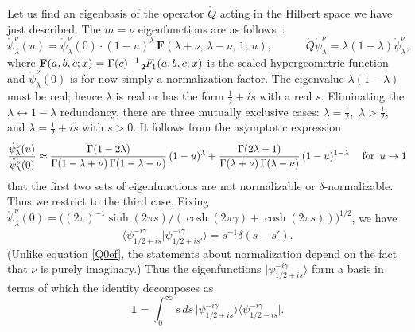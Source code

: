 \documentclass[12pt]{article}
\newcommand{\hgf}{%
\,\tensor[_{2\kern-1.2pt}]{F}{_{\kern-0.8pt 1}}\kern-1.2pt}
\newcommand{\hgfs}{\mathbf{F}}
\newcommand{\blangle}{\bigl\langle}
\newcommand{\brangle}{\bigr\rangle}
\newcommand*{\bbra}[1]{\blangle{#1}\big|}
\newcommand*{\bket}[1]{\big|{#1}\brangle}
\newcommand*{\bbraket}[2]{\blangle{#1}\big|{#2}\brangle}
\newcommand{\unit}{\mathbf{1}}
\newcommand{\rpsi}{\mathring{\psi}}
\newcommand{\rQ}{\mathring{Q}}
\newcommand{\lam}{\lambda}
\newcommand{\ga}{\gamma}
\newcommand{\ov}{\over}
\begin{document}
Let us find an eigenbasis of the operator $\rQ$ acting in the Hilbert space we have just described. The $m=\nu$ eigenfunctions are as follows~\cite{SL2R}:
\begin{equation} \label{Eucpsi}
\rpsi^{\nu}_{\lambda}(u)=\rpsi^{\nu}_{\lambda}(0)\cdot
(1-u)^\lambda\,\hgfs(\lambda+\nu,\,\lambda-\nu,\,1;\,u),
\qquad\quad
\rQ\rpsi^{\nu}_{\lambda}=\lambda(1-\lambda)\rpsi^{\nu}_{\lambda},
\end{equation}
where $\hgfs(a,b,c;x)=\Gamma(c)^{-1}\hgf(a,b,c;x)$ is the scaled hypergeometric function and $\rpsi^{\nu}_{\lam}(0)$ is for now simply a normalization factor. The eigenvalue $\lambda(1-\lambda)$ must be real; hence $\lambda$ is real or has the form $\frac{1}{2}+is$ with a real $s$. Eliminating the $\lambda\leftrightarrow 1-\lambda$ redundancy, there are three mutually exclusive cases: $\lambda=\frac{1}{2}$,\, $\lambda>\frac{1}{2}$, and $\lambda=\frac{1}{2}+is$ with $s>0$. It follows from the asymptotic expression
\begin{equation}\label{Q0ef}
{\rpsi^{\nu}_{\lambda}(u) \ov \rpsi^{\nu}_{\lambda}(0)}\approx
\frac{\Gamma(1-2\lambda)}{\Gamma(1-\lambda+\nu)\,\Gamma(1-\lambda-\nu)}\,
(1-u)^{\lambda}
+\frac{\Gamma(2\lambda-1)}{\Gamma(\lambda+\nu)\,\Gamma(\lambda-\nu)}\,
(1-u)^{1-\lambda}\quad\:
\text{for }\, u\to 1
\end{equation}
that the first two sets of eigenfunctions are not normalizable or $\delta$-normalizable. Thus we restrict to the third case. Fixing $\rpsi^{\nu}_{\lambda}(0)=\bigl((2\pi)^{-1}\sinh(2\pi s)/(\cosh(2\pi\ga) + \cosh(2\pi s))\bigr)^{1/2}$, we have
\begin{equation}
\bbraket{\psi^{-i\gamma}_{1/2+is}}{\psi^{-i\gamma}_{1/2+is'}} 
=s^{-1}\delta(s-s').
\end{equation}
(Unlike equation \eqref{Q0ef}, the statements about normalization depend on the fact that $\nu$ is purely imaginary.) Thus the eigenfunctions $\bket{\psi^{-i\gamma}_{1/2+is}}$ form a basis in terms of which the identity decomposes as
\begin{equation}\label{decid0}
\unit=\int_{0}^{\infty}s\,ds\, \bket{\psi^{-i\gamma}_{1/2+is}}\bbra{\psi^{-i\gamma}_{1/2+is}}.
\end{equation}
\end{document}
